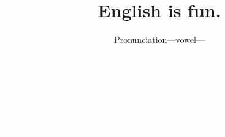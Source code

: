 \documentclass[aspectratio=169,xcolor={dvipsnames,table}]{beamer}
\title{English is fun.}
\subtitle{Pronunciation---vowel---}
\author{}
\institute[]{}
\date[]
\makeatletter
\newcommand*{\themonth}{\two@digits\month}
\newcommand*{\theday}{\two@digits\day}
\newcommand{\mytoday}{{\the\year}--{\themonth}--{\theday}}
\makeatother
\begin{document}
\begin{frame}
\raggedleft
  \textcolor{white}{\Huge\bfseries English is fun.}

\vfill

\raggedleft
 \textcolor{white}{\LARGE\bfseries \mytoday}

\vfill
\vfill
\vfill

\raggedleft
\textcolor{white}{\large The lesson will begin at the scheduled time.}

\end{frame}
\end{document}

